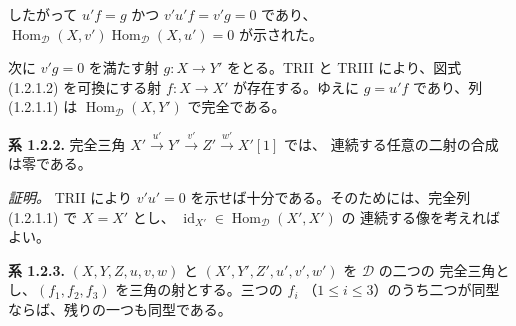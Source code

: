 したがって $u'f=g$ かつ $v'u'f=v'g=0$ であり、
$\operatorname{Hom}_{\mathcal D}(X,v')
\operatorname{Hom}_{\mathcal D}(X,u')=0$ が示された。

次に $v'g=0$ を満たす射 $g\colon X\longrightarrow Y'$ をとる。TRII と
TRIII により、図式 (1.2.1.2) を可換にする射
$f\colon X\longrightarrow X'$ が存在する。ゆえに $g=u'f$ であり、列
(1.2.1.1) は $\operatorname{Hom}_{\mathcal D}(X,Y')$ で完全である。

\medskip
\noindent\textbf{系 1.2.2.}\quad
完全三角
$X'\xrightarrow{u'}Y'\xrightarrow{v'}Z'\xrightarrow{w'}X'[1]$ では、
連続する任意の二射の合成は零である。

\noindent\emph{証明。}\quad
TRII により $v'u'=0$ を示せば十分である。そのためには、完全列
(1.2.1.1) で $X=X'$ とし、
$\operatorname{id}_{X'}\in\operatorname{Hom}_{\mathcal D}(X',X')$ の
連続する像を考えればよい。

\medskip
\noindent\textbf{系 1.2.3.}\quad
$(X,Y,Z,u,v,w)$ と $(X',Y',Z',u',v',w')$ を $\mathcal D$ の二つの
完全三角とし、$(f_1,f_2,f_3)$ を三角の射とする。三つの $f_i$
（$1\leq i\leq3$）のうち二つが同型ならば、残りの一つも同型である。
\endgroup
